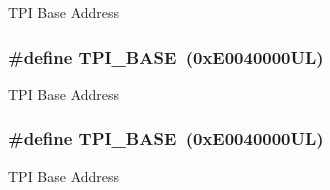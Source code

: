 T\-P\-I Base Address \hypertarget{group___c_m_s_i_s__core__base_ga2b1eeff850a7e418844ca847145a1a68}{
\subsubsection[{T\-P\-I\-\_\-\-B\-A\-S\-E}]{\setlength{\rightskip}{0pt plus 5cm}\#define T\-P\-I\-\_\-\-B\-A\-S\-E~(0x\-E0040000\-U\-L)}}\label{group___c_m_s_i_s__core__base_ga2b1eeff850a7e418844ca847145a1a68}
T\-P\-I Base Address \hypertarget{group___c_m_s_i_s__core__base_ga2b1eeff850a7e418844ca847145a1a68}{
\subsubsection[{T\-P\-I\-\_\-\-B\-A\-S\-E}]{\setlength{\rightskip}{0pt plus 5cm}\#define T\-P\-I\-\_\-\-B\-A\-S\-E~(0x\-E0040000\-U\-L)}}\label{group___c_m_s_i_s__core__base_ga2b1eeff850a7e418844ca847145a1a68}
T\-P\-I Base Address 